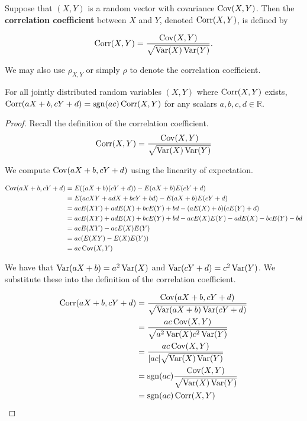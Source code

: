 \begin{definition}
	Suppose that $(X,Y)$ is a random vector with covariance $\operatorname{Cov}(X,Y)$. Then the \textbf{correlation coefficient} between $X$ and $Y$, denoted $\operatorname{Corr}(X,Y)$, is defined by

	$$\operatorname{Corr}(X,Y)=\frac{\operatorname{Cov}(X,Y)}{\sqrt{\operatorname{Var}(X)\operatorname{Var}(Y)}}.$$
\end{definition}

We may also use $\rho_{X,Y}$ or simply $\rho$ to denote the correlation coefficient.

\begin{theorem}[]
	For all jointly distributed random variables $(X,Y)$ where $\operatorname{Corr}(X,Y)$ exists, $\operatorname{Corr}(aX+b,cY+d)=\operatorname{sgn}(ac)\operatorname{Corr}(X,Y)$ for any scalars $a,b,c,d\in\mathbb R$.
\end{theorem}

\begin{proof}
	Recall the definition of the correlation coefficient. $$\operatorname{Corr}(X,Y)=\frac{\operatorname{Cov}(X,Y)}{\sqrt{\operatorname{Var}(X)\operatorname{Var}(Y)}}$$

	We compute $\operatorname{Cov}(aX+b,cY+d)$ using the linearity of expectation.

	\begin{align*}
		\operatorname{Cov}(aX+b,cY+d)&=E((aX+b)(cY+d))-E(aX+b)E(cY+d)\\
		&=E(acXY+adX+bcY+bd)-E(aX+b)E(cY+d)\\
		&=acE(XY)+adE(X)+bcE(Y)+bd-(aE(X)+b)(cE(Y)+d)\\
		&=acE(XY)+adE(X)+bcE(Y)+bd-acE(X)E(Y)-adE(X)-bcE(Y)-bd\\
		&=acE(XY)-acE(X)E(Y)\\
		&=ac(E(XY)-E(X)E(Y))\\
		&=ac\operatorname{Cov}(X,Y)
	\end{align*}

	We have that $\operatorname{Var}(aX+b)=a^2\operatorname{Var}(X)$ and $\operatorname{Var}(cY+d)=c^2\operatorname{Var}(Y)$. We substitute these into the definition of the correlation coefficient.

	\begin{align*}
		\operatorname{Corr}(aX+b,cY+d)&=\frac{\operatorname{Cov}(aX+b,cY+d)}{\sqrt{\operatorname{Var}(aX+b)\operatorname{Var}(cY+d)}}\\
		&=\frac{ac\operatorname{Cov}(X,Y)}{\sqrt{a^2\operatorname{Var}(X)c^2\operatorname{Var}(Y)}}\\
		&=\frac{ac\operatorname{Cov}(X,Y)}{|ac|\sqrt{\operatorname{Var}(X)\operatorname{Var}(Y)}}\\
		&=\operatorname{sgn}(ac)\frac{\operatorname{Cov}(X,Y)}{\sqrt{\operatorname{Var}(X)\operatorname{Var}(Y)}}\\
		&=\operatorname{sgn}(ac)\operatorname{Corr}(X,Y)
	\end{align*}
\end{proof}

